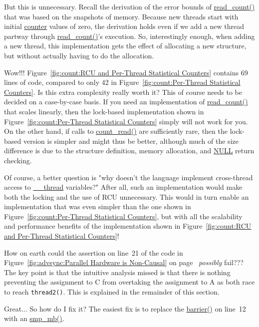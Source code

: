 	But this is unnecessary.
	Recall the derivation of the error bounds of \url{read_count()}
	that was based on the snapshots of memory.
	Because new threads start with initial \url{counter} values of
	zero, the derivation holds even if we add a new thread partway
	through \url{read_count()}'s execution.
	So, interestingly enough, when adding a new thread, this
	implementation gets the effect of allocating a new structure,
	but without actually having to do the allocation.

\QuickQ{}
	Wow!!!
	Figure~\ref{fig:count:RCU and Per-Thread Statistical Counters}
	contains 69 lines of code, compared to only 42 in
	Figure~\ref{fig:count:Per-Thread Statistical Counters}.
	Is this extra complexity really worth it?
\QuickA{}
	This of course needs to be decided on a case-by-case basis.
	If you need an implementation of \url{read_count()} that
	scales linearly, then the lock-based implementation shown in
	Figure~\ref{fig:count:Per-Thread Statistical Counters}
	simply will not work for you.
	On the other hand, if calls to \url{count_read()} are sufficiently
	rare, then the lock-based version is simpler and might thus be
	better, although much of the size difference is due
	to the structure definition, memory allocation, and \url{NULL}
	return checking.

	Of course, a better question is "why doesn't the language
	implement cross-thread access to \url{__thread} variables?"
	After all, such an implementation would make both the locking
	and the use of RCU unnecessary.
	This would in turn enable an implementation that
	was even simpler than the one shown in
	Figure~\ref{fig:count:Per-Thread Statistical Counters}, but
	with all the scalability and performance benefits of the
	implementation shown in
	Figure~\ref{fig:count:RCU and Per-Thread Statistical Counters}!

\QuickQ{}
	How on earth could the assertion on line~21 of the code in
	Figure~\ref{fig:advsync:Parallel Hardware is Non-Causal} on
	page~\pageref{fig:advsync:Parallel Hardware is Non-Causal}
	\emph{possibly} fail???
\QuickA{}
	The key point is that the intuitive analysis missed is that
	there is nothing preventing the assignment to C from overtaking
	the assignment to A as both race to reach {\tt thread2()}.
	This is explained in the remainder of this section.

\QuickQ{}
	Great...  So how do I fix it?
\QuickA{}
	The easiest fix is to replace the \url{barrier()} on
	line~12 with an \url{smp_mb()}.

